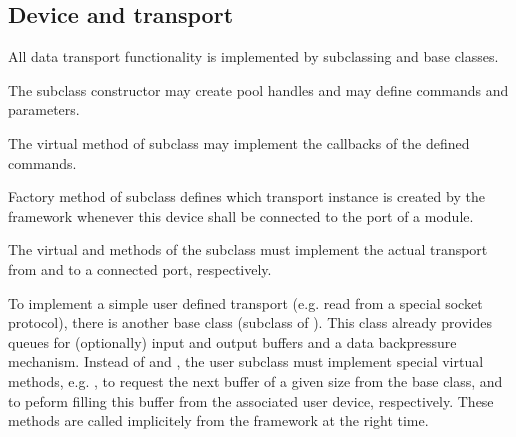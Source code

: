 \subsection{Device and transport}
All data transport functionality is implemented by 
   subclassing   and  base classes. 
\begin{compactitem}[$\circ$]
\item  The  subclass constructor may create  
      pool handles and may define commands and parameters. 
\item  The virtual  method of  
      subclass may implement the callbacks of the defined commands.
\item  Factory method  of 
      subclass defines which transport instance is created 
      by the framework whenever this device shall be connected to 
      the port of a module.   
\item  The virtual  and  methods of the 
       subclass must implement the actual transport 
      from and to a connected port, respectively.
\item  To implement a simple user defined transport 
      (e.g. read from a special socket protocol), 
      there is another base class  (subclass of ). 
      This class already provides queues for (optionally)
      input and output buffers and a data backpressure mechanism. 
      Instead of  and , the user subclass must implement 
      special virtual methods, e.g. ,  
      to request the next buffer of a given size from the base class, 
      and to peform filling this buffer from the associated user device, respectively. 
      These methods are called implicitely from the framework at the right time. 
\end{compactitem}
